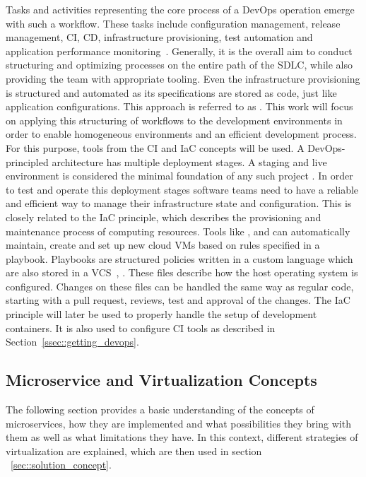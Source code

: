         \noindent Tasks and activities representing the core process of a DevOps operation emerge with such a workflow. These tasks include configuration management, release management, \ac{CI}, \ac{CD}, infrastructure provisioning, test automation and application performance monitoring~\cite{azuredevops}.
        Generally, it is the overall aim to conduct structuring and optimizing processes on the entire path of the \ac{SDLC}, while also providing the team with appropriate tooling. Even the infrastructure provisioning is structured and automated as its specifications are stored as code, just like application configurations. This approach is referred to as  \cite{base_devops}. This work will focus on applying this structuring of workflows to the development environments in order to enable homogeneous environments and an efficient development process. For this purpose, tools from the \ac{CI} and \ac{IaC} concepts will be used. \newline
        A DevOps-principled architecture has multiple deployment stages. A staging and live environment is considered the minimal foundation of any such project \cite{azuredevops}. In order to test and operate this deployment stages software teams need to have a reliable and efficient way to manage their infrastructure state and configuration. This is closely related to the \ac{IaC} principle, which describes the provisioning and maintenance process of computing resources. Tools like ,  and  can automatically maintain, create and set up new cloud \ac{VM}s based on rules specified in a playbook. Playbooks are structured policies written in a custom language which are also stored in a \ac{VCS}~\cite{ansible2020}, \cite{azuredevops}. These files describe how the host operating system is configured. Changes on these files can be handled the same way as regular code, starting with a pull request, reviews, test and approval of the changes. The \acl{IaC} principle will later be used to properly handle the setup of development containers. It is also used to configure \acs{CI} tools as described in Section~\ref{ssec::getting_devops}.

    \subsection{Microservice and Virtualization Concepts}\label{ssec::microservices}
    The following section provides a basic understanding of the concepts of microservices, how they are implemented and what possibilities they bring with them as well as what limitations they have. In this context, different strategies of virtualization are explained, which are then used in section ~\ref{sec::solution_concept}.


